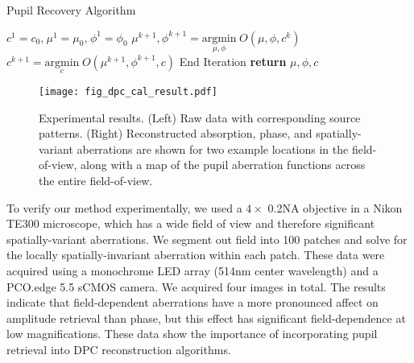 \begin{algorithm}
    \caption{Pupil Recovery Algorithm}
    \label{alg:pupil}
    \begin{algorithmic} %
            \State $c^1=c_0,\hspace{1pt}\mu^1=\mu_0,\hspace{1pt}\phi^1=\phi_0 $ 
                \State $\mu^{k+1},\phi^{k+1} = \underset{\mu,\phi }{\text{argmin}} \hspace{3pt} O(\mu,\phi,c^k)$
                \State $c^{k+1} = \underset{c}{ \text{argmin}} \hspace{3pt}O(\mu^{k+1},\phi^{k+1},c)$
                   \State End Iteration
                   \EndIf
            \EndFor
            \State \textbf{return} $\mu,\phi,c$
        \EndProcedure
    \end{algorithmic}
\end{algorithm}

\begin{figure}[H]
\centering
\texttt{[image: fig\_dpc\_cal\_result.pdf]}
\caption{\label{fig:results}
Experimental results. (Left) Raw data with corresponding source patterns. (Right) Reconstructed absorption, phase, and spatially-variant aberrations are shown for two example locations in the field-of-view, along with a map of the pupil aberration functions across the entire field-of-view.}
\end{figure}

To verify our method experimentally, we used a $4\times$ 0.2NA objective in a Nikon TE300 microscope, which has a wide field of view and therefore significant spatially-variant aberrations. We segment out field into 100 patches and solve for the locally spatially-invariant aberration within each patch. These data were acquired using a monochrome LED array (514nm center wavelength) and a PCO.edge 5.5 sCMOS camera. We acquired four images in total. The results indicate that field-dependent aberrations have a more pronounced affect on amplitude retrieval than phase, but this effect has significant field-dependence at low magnifications. These data show the importance of incorporating pupil retrieval into DPC reconstruction algorithms.
